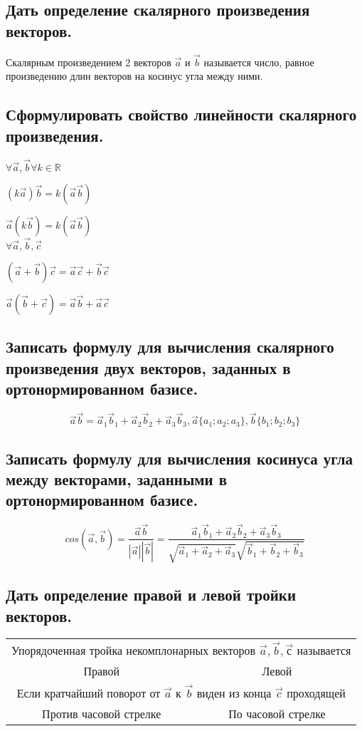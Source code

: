 \documentclass[a4paper, 10pt]{article}
\newcommand{\mcol}[1]{\multicolumn{2}{c}{#1}}
\renewcommand{\a}{\vec{a}}
\renewcommand{\b}{\vec{b}}
\renewcommand{\c}{\vec{c}}
\begin{document}
\subsection{Дать определение скалярного произведения векторов.}

Скалярным произведением 2 векторов $\a$ и $\b$ называется число, равное произведению длин
векторов на косинус угла между ними.

\subsection{Сформулировать свойство линейности скалярного произведения.}

\begin{center}
$\forall \a, \b \forall k \in \mathbb{R}$

$(k\a)\b = k(\a\b)$

$\a(k\b) = k(\a\b)$\\

$\forall \a, \b, \c$

$(\a + \b)\c = \a\c + \b\c$

$\a(\b + \c) = \a\b + \a\c$
\end{center}

\subsection{Записать формулу для вычисления скалярного произведения двух векторов, заданных в ортонормированном базисе.}

$$\a\b = \a_1\b_1 + \a_2\b_2 + \a_3\b_3,
\a\{a_1;a_2;a_3\},\b\{b_1;b_2;b_3\} $$

\subsection{Записать формулу для вычисления косинуса угла между векторами, заданными в ортонормированном базисе.}

$$cos(\a,\b) = \frac{ \a \b }{ |\a| |\b| } = 
\frac{\a_1\b_1 + \a_2\b_2 + \a_3\b_3}
{\sqrt{\a_1 + \a_2 + \a_3}\sqrt{\b_1+\b_2+\b_3}}$$

\subsection{Дать определение правой и левой тройки векторов.}

\begin{center}
\begin{tabular}{c c} 

    \mcol{Упорядоченная тройка некомплонарных векторов $\a, \b, \vec{с}$ называется }\\
    Правой & Левой \\
    \mcol{Если кратчайший поворот от $\a$ к $\b$ виден из конца $\c$ проходящей}\\
    Против часовой стрелке & По часовой стрелке\\

\end{tabular}
\end{center}
\end{document}
